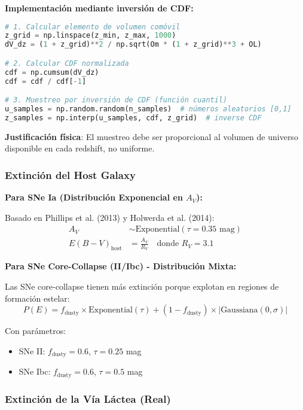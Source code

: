 \documentclass[11pt,a4paper]{article}
\begin{document}
\textbf{Implementación mediante inversión de CDF:}

\begin{lstlisting}[language=Python, caption=Muestreo de redshift por inversión de CDF]
# 1. Calcular elemento de volumen comóvil
z_grid = np.linspace(z_min, z_max, 1000)
dV_dz = (1 + z_grid)**2 / np.sqrt(Om * (1 + z_grid)**3 + OL)

# 2. Calcular CDF normalizada
cdf = np.cumsum(dV_dz)
cdf = cdf / cdf[-1]

# 3. Muestreo por inversión de CDF (función cuantil)
u_samples = np.random.random(n_samples)  # números aleatorios [0,1]
z_samples = np.interp(u_samples, cdf, z_grid)  # inverse CDF
\end{lstlisting}

\textbf{Justificación física}: El muestreo debe ser proporcional al volumen de universo disponible en cada redshift, no uniforme.

\subsubsection{Extinción del Host Galaxy}

\textbf{Para SNe Ia (Distribución Exponencial en $A_V$):}

Basado en Phillips et al. (2013) y Holwerda et al. (2014):
\begin{align}
A_V &\sim \text{Exponential}(\tau = 0.35 \text{ mag}) \\
E(B-V)_{\text{host}} &= \frac{A_V}{R_V} \quad \text{donde } R_V = 3.1
\end{align}

\textbf{Para SNe Core-Collapse (II/Ibc) - Distribución Mixta:}

Las SNe core-collapse tienen más extinción porque explotan en regiones de formación estelar:
\begin{equation}
P(E) = f_{\text{dusty}} \times \text{Exponential}(\tau) + (1-f_{\text{dusty}}) \times |\text{Gaussiana}(0,\sigma)|
\end{equation}

Con parámetros:
\begin{itemize}
    \item SNe II: $f_{\text{dusty}} = 0.6$, $\tau = 0.25$ mag
    \item SNe Ibc: $f_{\text{dusty}} = 0.6$, $\tau = 0.5$ mag
\end{itemize}

\subsubsection{Extinción de la Vía Láctea (Real)}
\end{document}
